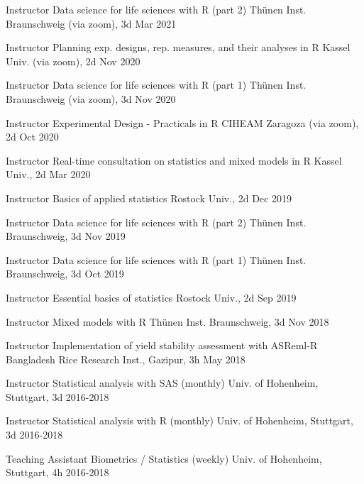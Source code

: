 \documentclass[11pt, a4paper]{awesome-cv}
\begin{document}
\begin{cvhonors}

  \cvhonor
    {Instructor  }
    {Data science for life sciences with R (part 2)}
    {Thünen Inst. Braunschweig (via zoom), 3d}
    {Mar 2021  } 

  \cvhonor
    {Instructor  }
    {Planning exp. designs, rep. measures, and their analyses in R}
    {Kassel Univ. (via zoom), 2d}
    {Nov 2020  }
    
  \cvhonor
    {Instructor  }
    {Data science for life sciences with R (part 1)}
    {Thünen Inst. Braunschweig (via zoom), 3d}
    {Nov 2020  } 
    
  \cvhonor
    {Instructor  }
    {Experimental Design - Practicals in R}
    {CIHEAM Zaragoza (via zoom), 2d}
    {Oct 2020  }

  \cvhonor
    {Instructor  }
    {Real-time consultation on statistics and mixed models in R}
    {Kassel Univ., 2d}
    {Mar 2020  }
    
  \cvhonor
    {Instructor  }
    {Basics of applied statistics}
    {Rostock Univ., 2d}
    {Dec 2019  }
  
  \cvhonor
    {Instructor  }
    {Data science for life sciences with R (part 2)}
    {Thünen Inst. Braunschweig, 3d}
    {Nov 2019  }    

  \cvhonor
    {Instructor  }
    {Data science for life sciences with R (part 1)}
    {Thünen Inst. Braunschweig, 3d}
    {Oct 2019  }      

  \cvhonor
    {Instructor  }
    {Essential basics of statistics}
    {Rostock Univ., 2d}
    {Sep 2019  }  

  \cvhonor
    {Instructor  }
    {Mixed models with R}
    {Thünen Inst. Braunschweig, 3d}
    {Nov 2018  }  
    
  \cvhonor
    {Instructor  }
    {Implementation of yield stability assessment with ASReml-R}
    {Bangladesh Rice Research Inst., Gazipur, 3h}
    {May 2018  }
    
  \cvhonor
    {Instructor  }
    {Statistical analysis with SAS (monthly)}
    {Univ. of Hohenheim, Stuttgart, 3d}
    {2016-2018  }
    
  \cvhonor
    {Instructor  }
    {Statistical analysis with R (monthly)}
    {Univ. of Hohenheim, Stuttgart, 3d}
    {2016-2018  }
    
  \cvhonor
    {Teaching Assistant  }
    {Biometrics / Statistics (weekly)}
    {Univ. of Hohenheim, Stuttgart, 4h}
    {2016-2018  }
        
\end{cvhonors}
\end{document}
